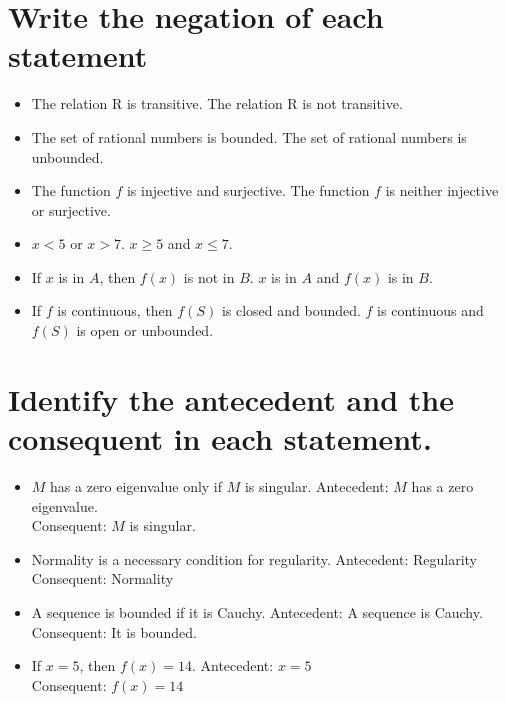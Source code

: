 \documentclass[11pt]{article} %
\begin{document}
\section{Write the negation of each statement}
\begin{itemize}
	\item The relation R is transitive.
	\subitem The relation R is not transitive.
	
	\item The set of rational numbers is bounded.
	\subitem The set of rational numbers is unbounded.
	
	\item The function $f$ is injective and surjective.
	\subitem The function $f$ is neither injective or surjective.
	
	\item $x<5$ or $x>7$.
	\subitem $x \geq 5$ and $x \leq 7$.

	\item If $x$ is in $A$, then $f(x)$ is not in $B$.
	\subitem $x$ is in $A$ and $f(x)$ is in $B$.
	
	\item If $f$ is continuous, then $f(S)$ is closed and bounded.
	\subitem $f$ is continuous and $f(S)$ is open or unbounded.

\end{itemize}

\section{Identify the antecedent and the consequent in each statement.}
\begin{itemize}
	\item $M$ has a zero eigenvalue only if $M$ is singular.
	\subitem Antecedent: $M$ has a zero eigenvalue.\\ Consequent: $M$ is singular.
	
	\item Normality is a necessary condition for regularity.
	\subitem Antecedent: Regularity\\ Consequent: Normality
	
	\item A sequence is bounded if it is Cauchy.
	\subitem Antecedent: A sequence is Cauchy.\\ Consequent: It is bounded.
	
	\item If $x=5$, then $f(x)=14$.
	\subitem Antecedent: $x=5$\\ Consequent: $f(x)=14$
\end{itemize}
\end{document}
